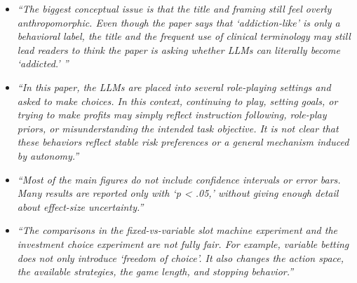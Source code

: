 \begin{itemize}
\item[\textbf{W1.}] \itshape ``The biggest conceptual issue is that the title and framing still
feel overly anthropomorphic. Even though the paper says that `addiction-like' is only a
behavioral label, the title and the frequent use of clinical terminology may still lead readers
to think the paper is asking whether LLMs can literally become `addicted.' ''
\upshape
{}

\item[\textbf{W2.}] \itshape ``In this paper, the LLMs are placed into several role-playing
settings and asked to make choices. In this context, continuing to play, setting goals, or
trying to make profits may simply reflect instruction following, role-play priors, or
misunderstanding the intended task objective. It is not clear that these behaviors reflect
stable risk preferences or a general mechanism induced by autonomy.''
\upshape
{}

\item[\textbf{W3.}] \itshape ``Most of the main figures do not include confidence intervals or
error bars. Many results are reported only with `p < .05,' without giving enough detail about
effect-size uncertainty.''
\upshape
{}

\item[\textbf{W4.}] \itshape ``The comparisons in the fixed-vs-variable slot machine experiment
and the investment choice experiment are not fully fair. For example, variable betting does not
only introduce `freedom of choice'. It also changes the action space, the available strategies,
the game length, and stopping behavior.''
\upshape
{}
\end{itemize}

